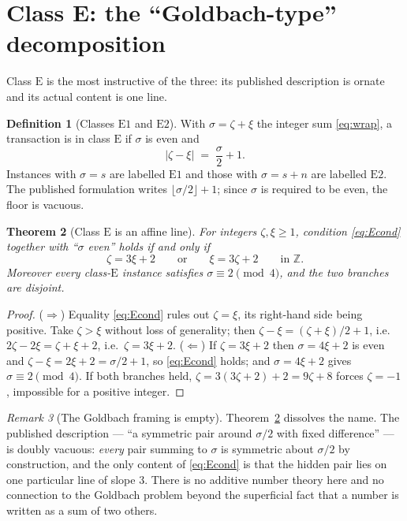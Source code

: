 \documentclass[11pt,a4paper]{article}
\theoremstyle{plain}
\newtheorem{theorem}{Theorem}
\theoremstyle{definition}
\newtheorem{definition}[theorem]{Definition}
\theoremstyle{remark}
\newtheorem{remark}[theorem]{Remark}
\newcommand{\Zz}{\mathbb{Z}}
\newcommand{\clE}{\mathrm{E}}
\begin{document}
\section{Class E: the ``Goldbach-type'' decomposition}\label{sec:E}

Class $\clE$ is the most instructive of the three: its published description is ornate and its
actual content is one line.

\begin{definition}[Classes $\clE1$ and $\clE2$]\label{def:E}
With $\sigma = \zeta+\xi$ the integer sum \eqref{eq:wrap}, a transaction is in class $\clE$ if
$\sigma$ is even and
\begin{equation}\label{eq:Econd}
  \bigl|\zeta - \xi\bigr| \;=\; \frac{\sigma}{2} + 1 .
\end{equation}
Instances with $\sigma = s$ are labelled $\clE1$ and those with $\sigma = s+n$ are labelled
$\clE2$. The published formulation writes $\lfloor\sigma/2\rfloor + 1$; since $\sigma$ is required
to be even, the floor is vacuous.
\end{definition}

\begin{theorem}[Class $\clE$ is an affine line]\label{thm:Estruct}
For integers $\zeta,\xi \ge 1$, condition \eqref{eq:Econd} together with ``$\sigma$ even'' holds
if and only if
\begin{equation}\label{eq:Eline}
  \zeta = 3\xi + 2 \qquad\text{or}\qquad \xi = 3\zeta + 2 \qquad\text{in } \Zz .
\end{equation}
Moreover every class-$\clE$ instance satisfies $\sigma \equiv 2 \pmod 4$, and the two branches are
disjoint.
\end{theorem}

\begin{proof}
($\Rightarrow$) Equality \eqref{eq:Econd} rules out $\zeta = \xi$, its right-hand side being
positive. Take $\zeta > \xi$ without loss of generality; then
$\zeta - \xi = (\zeta+\xi)/2 + 1$, i.e.\ $2\zeta - 2\xi = \zeta + \xi + 2$, i.e.\
$\zeta = 3\xi+2$.
($\Leftarrow$) If $\zeta = 3\xi+2$ then $\sigma = 4\xi+2$ is even and
$\zeta - \xi = 2\xi + 2 = \sigma/2 + 1$, so \eqref{eq:Econd} holds; and $\sigma = 4\xi+2$ gives
$\sigma \equiv 2 \pmod 4$. If both branches held, $\zeta = 3(3\zeta+2)+2 = 9\zeta+8$ forces
$\zeta = -1$, impossible for a positive integer.
\end{proof}

\begin{remark}[The Goldbach framing is empty]
Theorem~\ref{thm:Estruct} dissolves the name. The published description --- ``a symmetric pair
around $\sigma/2$ with fixed difference'' --- is doubly vacuous: \emph{every} pair summing to
$\sigma$ is symmetric about $\sigma/2$ by construction, and the only content of \eqref{eq:Econd}
is that the hidden pair lies on one particular line of slope $3$. There is no additive number
theory here and no connection to the Goldbach problem beyond the superficial fact that a number is
written as a sum of two others.
\end{remark}
\end{document}
